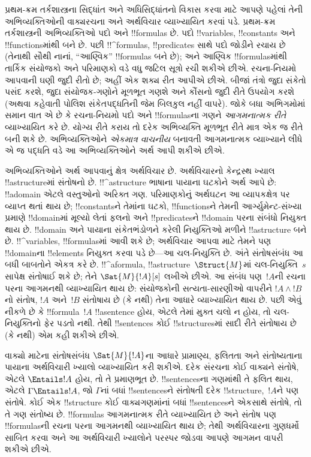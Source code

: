 \documentclass[../../../include/open-logic-section]{subfiles}
\begin{document}


પ્રથમ-ક્રમ તર્કશાસ્ત્રના સિદ્ધાંત અને
અધિસિદ્ધાંતનો વિકાસ કરવા માટે આપણે
પહેલાં તેની અભિવ્યક્તિઓની વાક્યરચના
અને અર્થવિચાર વ્યાખ્યાયિત કરવાં પડે.
પ્રથમ-ક્રમ તર્કશાસ્ત્રની અભિવ્યક્તિઓ
પદો અને !!{formula}s છે. પદો
!!{variable}s, !!{constant}s અને
!!{function}sમાંથી બને છે.
પછી !!^{formula}s, !!{predicate}s
સાથે પદો જોડીને રચાય છે
(તેનાથી સૌથી નાનાં, “આણ્વિક”
!!{formula}s બને છે); અને આણ્વિક
!!{formula}sમાંથી તાર્કિક સંયોજકો
અને પરિમાણકો વડે વધુ જટિલ
સૂત્રો રચી શકીએ છીએ.
રચના-નિયમો આપવાની ઘણી જુદી
રીતો છે; અહીં એક શક્ય
રીત આપીએ છીએ. બીજાં તંત્રો
જુદા સંકેતો પસંદ કરશે,
જુદા સંયોજક-ગણોને મૂળભૂત
ગણશે અને કૌંસનો જુદી
રીતે ઉપયોગ કરશે
(અથવા કહેવાતી પોલિશ
સંકેતપદ્ધતિની જેમ બિલકુલ
નહીં વાપરે). જોકે બધા
અભિગમોમાં સમાન વાત
એ છે કે રચના-નિયમો
પદો અને !!{formula}sના ગણને
\emph{આગમનાત્મક રીતે}
વ્યાખ્યાયિત કરે છે.
યોગ્ય રીતે કરાય તો
દરેક અભિવ્યક્તિ મૂળભૂત
રીતે માત્ર એક જ રીતે
બની શકે છે. અભિવ્યક્તિઓને
\emph{એકમાત્ર વાચનીય}
બનાવતી આગમનાત્મક
વ્યાખ્યાને લીધે એ જ
પદ્ધતિ વડે આ
અભિવ્યક્તિઓને અર્થ
આપી શકીએ છીએ.

અભિવ્યક્તિઓને અર્થ આપવાનું ક્ષેત્ર
અર્થવિચાર છે. અર્થવિચારનો કેન્દ્રસ્થ
ખ્યાલ !!a{structure}માં સંતોષનો છે.
!!^a{structure} ભાષાના પાયાના
ઘટકોને અર્થ આપે છે:
!!a{domain} એટલે વસ્તુઓનો
અરિક્ત ગણ. પરિમાણકોનું
અર્થઘટન આ વ્યાપકક્ષેત્ર
પર વ્યાપ્ત થતાં થાય છે;
!!{constant}sને તેમાંના ઘટકો,
!!{function}sને તેમની આર્ગ્યુમેન્ટ-સંખ્યા પ્રમાણે
!!{domain}માં મૂલ્યો લેતાં ફલનો અને
!!{predicate}sને !!{domain}
પરના સંબંધો નિયુક્ત થાય છે.
!!{domain} અને પાયાના
સંકેતભંડોળને કરેલી નિયુક્તિઓ
મળીને !!a{structure} બને છે.
!!^{variable}s, !!{formula}sમાં
આવી શકે છે; અર્થવિચાર
આપવા માટે તેમને પણ
!!{domain}ના !!{element}s
નિયુક્ત કરવા પડે છે—આ
ચલ-નિયુક્તિ છે. અંતે
સંતોષસંબંધ આ બધી બાબતોને
એકત્ર કરે છે. !!^a{formula},
!!a{structure}~$\Struct{M}$માં
ચલ-નિયુક્તિ~$s$ સાપેક્ષ
સંતોષાઈ શકે છે; તેને
$\Sat{M}{!A}[s]$ લખીએ છીએ.
આ સંબંધ પણ~$!A$ની
રચના પરના આગમનથી
વ્યાખ્યાયિત થાય છે:
સંયોજકોની સત્યતા-સારણીઓ
વાપરીને $!A \land !B$નો
સંતોષ, $!A$ અને~$!B$
સંતોષાય છે (કે નથી)
તેના આધારે વ્યાખ્યાયિત
થાય છે. પછી એવું
નીકળે છે કે
!!{formula}~$!A$
!!a{sentence} હોય,
એટલે તેમાં મુક્ત
ચલો ન હોય, તો
ચલ-નિયુક્તિનો ફેર
પડતો નથી. તેથી
!!{sentence}s કોઈ
!!{structure}sમાં
સાદી રીતે સંતોષાય
છે (કે નથી) એમ
કહી શકીએ છીએ.

વાક્યો માટેના સંતોષસંબંધ
$\Sat{M}{!A}$ના આધારે
પ્રામાણ્ય, ફલિતતા અને
સંતોષ્યતાના પાયાના
અર્થવિચારી ખ્યાલો
વ્યાખ્યાયિત કરી શકીએ.
દરેક સંરચના કોઈ
વાક્યને સંતોષે,
એટલે $\Entails !A$
હોય, તો તે પ્રમાણભૂત છે.
!!{sentence}sના ગણમાંથી
તે ફલિત થાય, એટલે
$\Gamma \Entails !A$,
જો $\Gamma$નાં
બધાં !!{sentence}sને
સંતોષતી દરેક
!!{structure},~$!A$ને
પણ સંતોષે. કોઈ એક
!!{structure} કોઈ
વાક્યગણમાંનાં બધાં
!!{sentence}sને
એકસાથે સંતોષે,
તો તે ગણ સંતોષ્ય છે.
!!{formula}s આગમનાત્મક
રીતે વ્યાખ્યાયિત છે
અને સંતોષ પણ
!!{formula}sની રચના
પરના આગમનથી
વ્યાખ્યાયિત થાય છે;
તેથી અર્થવિચારના
ગુણધર્મો સાબિત
કરવા અને આ
અર્થવિચારી ખ્યાલોને
પરસ્પર જોડવા આપણે
આગમન વાપરી શકીએ છીએ.
\end{document}
